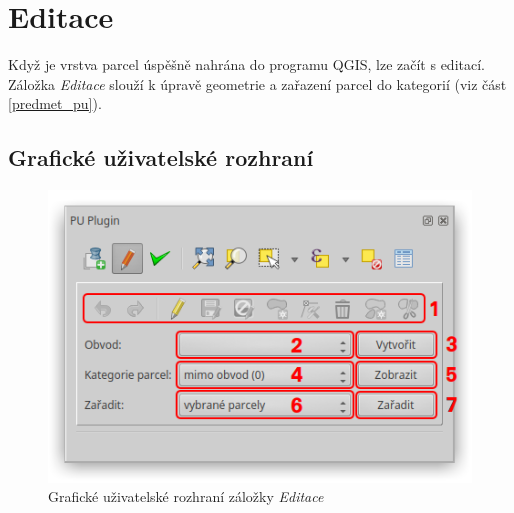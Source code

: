 \newpage

\section{Editace}
\label{editace}

Když je vrstva parcel úspěšně nahrána do programu QGIS, lze začít s editací. Záložka \textit{Editace} slouží k úpravě geometrie a zařazení parcel do kategorií (viz část \ref{predmet_pu}).

\subsection{Grafické uživatelské rozhraní}
\label{editace_gui}

	\begin{figure}[H]
		\centering
		\includegraphics[width=.55\textwidth]{./pictures/editace_gui.png}
		\caption[Grafické uživatelské rozhraní záložky \textit{Editace}]{Grafické uživatelské rozhraní záložky \textit{Editace}}
		\label{fig:editace_gui}
 	\end{figure}

